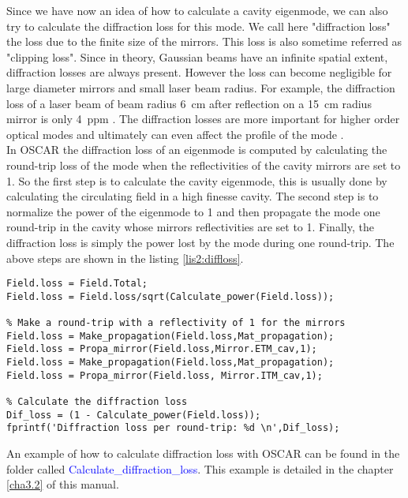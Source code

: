Since we have now an idea of how to calculate a cavity eigenmode, we can also try to calculate the diffraction loss for this mode. We call here "diffraction loss" the loss due to the finite size of the mirrors. This loss is also sometime referred as "clipping loss". Since in theory, Gaussian beams have an infinite spatial extent, diffraction losses are always present. However the loss can become negligible for large diameter mirrors and
small laser beam radius. For example, the diffraction loss of a laser beam of beam radius 6~cm after reflection on a 15~cm radius mirror is only 4~ppm \cite{Siegman}. The diffraction losses are more important for higher order optical modes and ultimately can even affect the profile of the mode \cite{Pab}.\\

In OSCAR the diffraction loss of an eigenmode is computed by calculating the round-trip loss of the mode when the reflectivities of the cavity mirrors are set to 1. So the first step is to calculate the cavity eigenmode, this is usually done by calculating the circulating field in a high finesse cavity. The second step is to normalize the power of the eigenmode to 1 and then propagate the mode one round-trip in the cavity whose mirrors reflectivities are set to 1. Finally, the diffraction loss is simply the power lost by the mode during one round-trip. The above steps are shown in the listing \ref{lis2:diffloss}.

\begin{lstlisting}[float=tp,caption=Piece of code used to calculate the diffraction loss. We suppose that we have already calculated the circulating field \emph{Field.Total}. \label{lis2:diffloss},frame=lines]
% Normalise the circulating field (=the eigenmode)
Field.loss = Field.Total;
Field.loss = Field.loss/sqrt(Calculate_power(Field.loss));

% Make a round-trip with a reflectivity of 1 for the mirrors
Field.loss = Make_propagation(Field.loss,Mat_propagation);
Field.loss = Propa_mirror(Field.loss,Mirror.ETM_cav,1);
Field.loss = Make_propagation(Field.loss,Mat_propagation);
Field.loss = Propa_mirror(Field.loss, Mirror.ITM_cav,1);

% Calculate the diffraction loss
Dif_loss = (1 - Calculate_power(Field.loss));
fprintf('Diffraction loss per round-trip: %d \n',Dif_loss);
\end{lstlisting}

An example of how to calculate diffraction loss with OSCAR can be found in the folder called \textcolor{blue}{Calculate\_diffraction\_loss}. This example is detailed in the chapter \ref{cha3.2} of this manual.

